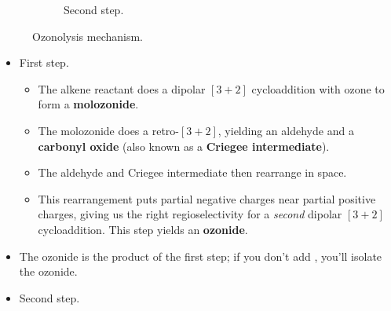\documentclass[../notes.tex]{subfiles}
\begin{document}
\begin{itemize}
\begin{figure}[H]
\begin{subfigure}[b]{\linewidth}
            \schemestop
            \chemnameinit{}
            \caption{Second step.}
            \label{fig:mechOzonolysisb}
        \end{subfigure}
        \caption{Ozonolysis mechanism.}
        \label{fig:mechOzonolysis}
    \end{figure}
    \begin{itemize}
        \item First step.
        \begin{itemize}
            \item The alkene reactant does a dipolar $[3+2]$ cycloaddition with ozone to form a \textbf{molozonide}.
            \item The molozonide does a retro-$[3+2]$, yielding an aldehyde and a \textbf{carbonyl oxide} (also known as a \textbf{Criegee intermediate}).
            \item The aldehyde and Criegee intermediate then rearrange in space.
            \item This rearrangement puts partial negative charges near partial positive charges, giving us the right regioselectivity for a \emph{second} dipolar $[3+2]$ cycloaddition. This step yields an \textbf{ozonide}.
        \end{itemize}
        \item The ozonide is the product of the first step; if you don't add , you'll isolate the ozonide.
        \item Second step.
        \begin{itemize}

\end{itemize}
\end{itemize}
\end{itemize}
\end{document}
